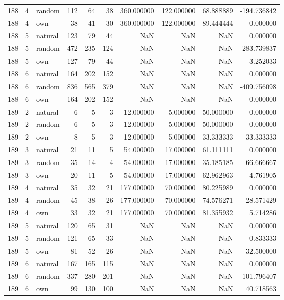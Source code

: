 \begin{table}[htbp]
\begin{tabular}{rrlrrrrrrr}
188 & 4 & random & 112 & 64 & 38 & 360.000000 & 122.000000 & 68.888889 & -194.736842 \\
188 & 4 & own & 38 & 41 & 30 & 360.000000 & 122.000000 & 89.444444 & 0.000000 \\
188 & 5 & natural & 123 & 79 & 44 & NaN & NaN & NaN & 0.000000 \\
188 & 5 & random & 472 & 235 & 124 & NaN & NaN & NaN & -283.739837 \\
188 & 5 & own & 127 & 79 & 44 & NaN & NaN & NaN & -3.252033 \\
188 & 6 & natural & 164 & 202 & 152 & NaN & NaN & NaN & 0.000000 \\
188 & 6 & random & 836 & 565 & 379 & NaN & NaN & NaN & -409.756098 \\
188 & 6 & own & 164 & 202 & 152 & NaN & NaN & NaN & 0.000000 \\
189 & 2 & natural & 6 & 5 & 3 & 12.000000 & 5.000000 & 50.000000 & 0.000000 \\
189 & 2 & random & 6 & 5 & 3 & 12.000000 & 5.000000 & 50.000000 & 0.000000 \\
189 & 2 & own & 8 & 5 & 3 & 12.000000 & 5.000000 & 33.333333 & -33.333333 \\
189 & 3 & natural & 21 & 11 & 5 & 54.000000 & 17.000000 & 61.111111 & 0.000000 \\
189 & 3 & random & 35 & 14 & 4 & 54.000000 & 17.000000 & 35.185185 & -66.666667 \\
189 & 3 & own & 20 & 11 & 5 & 54.000000 & 17.000000 & 62.962963 & 4.761905 \\
189 & 4 & natural & 35 & 32 & 21 & 177.000000 & 70.000000 & 80.225989 & 0.000000 \\
189 & 4 & random & 45 & 38 & 26 & 177.000000 & 70.000000 & 74.576271 & -28.571429 \\
189 & 4 & own & 33 & 32 & 21 & 177.000000 & 70.000000 & 81.355932 & 5.714286 \\
189 & 5 & natural & 120 & 65 & 31 & NaN & NaN & NaN & 0.000000 \\
189 & 5 & random & 121 & 65 & 33 & NaN & NaN & NaN & -0.833333 \\
189 & 5 & own & 81 & 52 & 26 & NaN & NaN & NaN & 32.500000 \\
189 & 6 & natural & 167 & 165 & 115 & NaN & NaN & NaN & 0.000000 \\
189 & 6 & random & 337 & 280 & 201 & NaN & NaN & NaN & -101.796407 \\
189 & 6 & own & 99 & 130 & 100 & NaN & NaN & NaN & 40.718563 \\

\end{tabular}
\end{table}
